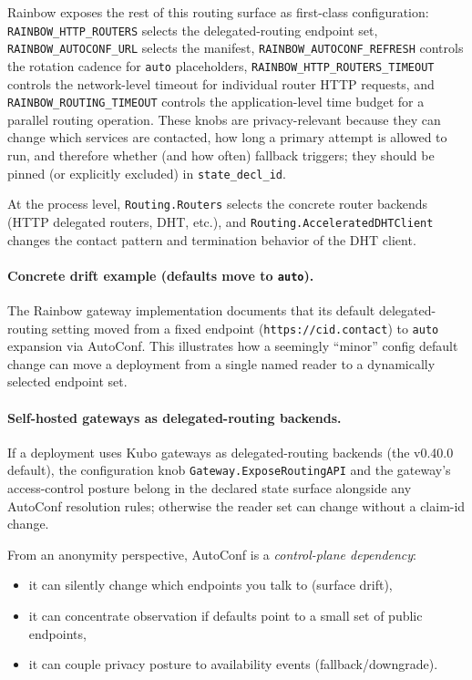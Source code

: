 \documentclass[11pt]{article}
\begin{document}
Rainbow exposes the rest of this routing surface as first-class configuration: \texttt{RAINBOW\_HTTP\_ROUTERS} selects the delegated-routing endpoint set, \texttt{RAINBOW\_AUTOCONF\_URL} selects the manifest, \texttt{RAINBOW\_AUTOCONF\_\allowbreak REFRESH} controls the rotation cadence for \texttt{auto} placeholders, \texttt{RAINBOW\_HTTP\_ROUTERS\_\allowbreak TIMEOUT} controls the network-level timeout for individual router HTTP requests, and \texttt{RAINBOW\_ROUTING\_\allowbreak TIMEOUT} controls the application-level time budget for a parallel routing operation. These knobs are privacy-relevant because they can change which services are contacted, how long a primary attempt is allowed to run, and therefore whether (and how often) fallback triggers; they should be pinned (or explicitly excluded) in \texttt{state\_decl\_id}.\cite{rainbowEnvVars}

At the process level, \texttt{Routing.Routers} selects the concrete router backends (HTTP delegated routers, DHT, etc.), and \texttt{Routing.AcceleratedDHTClient} changes the contact pattern and termination behavior of the DHT client.\cite{kuboConfigPathRouting}

\paragraph{Concrete drift example (defaults move to \texttt{auto}).}
The Rainbow gateway implementation documents that its default delegated-routing setting moved from a fixed endpoint (\texttt{https://cid.contact}) to \texttt{auto} expansion via AutoConf.
This illustrates how a seemingly ``minor'' config default change can move a deployment from a single named reader to a dynamically selected endpoint set.\cite{rainbowChangelogAutoconf}

\paragraph{Self-hosted gateways as delegated-routing backends.}
If a deployment uses Kubo gateways as delegated-routing backends (the v0.40.0 default), the configuration knob \texttt{Gateway.ExposeRoutingAPI} and the gateway's access-control posture belong in the declared state surface alongside any AutoConf resolution rules; otherwise the reader set can change without a claim-id change.\cite{kuboReleaseV040,kuboConfigExposeRoutingAPI}

From an anonymity perspective, AutoConf is a \emph{control-plane dependency}:
\begin{itemize}[leftmargin=*]
\item it can silently change which endpoints you talk to (surface drift),
\item it can concentrate observation if defaults point to a small set of public endpoints,
\item it can couple privacy posture to availability events (fallback/downgrade).
\end{itemize}
\end{document}
